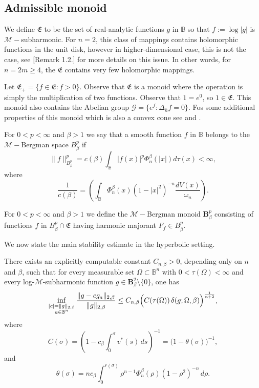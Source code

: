 \documentclass[a4paper,10pt]{amsart}
\begin{document}




\subsection{Admissible monoid}\label{ssec:admissible}
We define $\mathfrak{E}$ to be the set of real-analytic  functions $g$ in $\mathbb{B}$  so that
$f:=\log |g|$ is $\mathcal{M}-$subharmonic. For $n=2$, this class of mappings contains holomorphic functions in the unit disk, however in higher-dimensional case, this is not the case, see \cite{kalaj2024}[Remark 1.2.] for more details on this issue. In other words, for $n=2m\ge 4$, the $\mathfrak{E}$ contains very few holomorphic mappings.

Let  $\mathfrak{E}_+=\{f\in \mathfrak{E}: f>0\}$. Observe that $\mathfrak{E}$ is a monoid where the operation is simply the multiplication of two functions.  Observe that $1=e^0$, so $1\in \mathfrak{E}$. This monoid also contains the Abelian group $\mathcal{G}=\{e^f: \Delta_hf=0\}$. Fos some additional properties of this monoid which is also a convex cone see \cite{kalaj2024} and \cite{kalajramos2024}.



\begin{numdefn}
For $0 < p < \infty$ and $\beta > 1$ we say that a smooth function $f$  in $\mathbb{B}$ belongs to the $\mathcal{M}-$Bergman space ${B}^p_\beta$ if
$$\|f\|_{{B}^p_\beta}^p = c(\beta)\int_\mathbb{B} |f(x)|^p \Phi_n^\beta(|x|) d\tau(x) < \infty,$$ where
$$\frac{1}{c(\beta)}=\left( \int_{\mathbb{B}} \Phi^\beta_n(x)(1-|x|^2)^{-n}\frac{dV(x)}{{\omega_n}}\right).$$
\end{numdefn}
\begin{numdefn}
 For $0 < p < \infty$ and $\beta > 1$ we define
the $\mathcal{M}-$Bergman monoid $\mathbf{B}^p_\beta$ consisting of functions $f$ in ${B}^p_\beta\cap \mathfrak{E}$ having harmonic majorant $F_f\in {B}^p_\beta$.
\end{numdefn}


We now state the main stability estimate in the hyperbolic setting.

\begin{numthm}\label{stabb}
There exists an explicitly computable constant \(C_{n,\beta}>0\), depending only on
\(n\) and \(\beta\), such that for every measurable set
\(\Omega\subset \mathbb{B}^n\) with \(0<\tau(\Omega)<\infty\) and every
log-\(\mathcal M\)-subharmonic function \(g\in \mathbf{B}^2_\beta\setminus\{0\}\),
one has
\[
\inf_{\substack{|c|=\|g\|_{2,\beta}\\ a\in\mathbb{B}^n}}
\frac{\|g-cg_a\|_{2,\beta}}{\|g\|_{2,\beta}}
\le
C_{n,\beta}\Bigl(C(\tau(\Omega))\,\delta(g;\Omega,\beta)\Bigr)^{\frac1{n+2}},
\]
where
\[
C(\sigma)
=
\left(1-c_\beta\int_0^\sigma v^*(s)\,ds\right)^{-1}
=
\bigl(1-\theta(\sigma)\bigr)^{-1},
\]
and
\[
\theta(\sigma)
=
n c_\beta \int_0^{r(\sigma)}
\rho^{n-1}\Phi_n^\beta(\rho)(1-\rho^2)^{-n}\,d\rho .
\]
\end{numthm}
\end{document}
